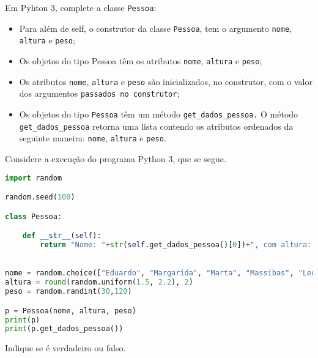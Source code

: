 \documentclass[12pt,varwidth=16cm,border=17pt]{standalone}
\begin{document}
Em Pyhton 3, complete a classe \verb+Pessoa+:

\begin{itemize}
  \item Para além de self, o construtor da classe \verb+Pessoa+, tem o argumento \verb+nome+, \verb+altura+ e \verb+peso+;
  \item Os objetos do tipo Pessoa têm os atributos \verb+nome+, \verb+altura+ e \verb+peso+;
  \item Os atributos \verb+nome+, \verb+altura+ e \verb+peso+ são inicializados, no construtor, com o valor
   dos argumentos \verb+passados no construtor+;
  \item Os objetos do tipo \verb+Pessoa+ têm um método \verb+get_dados_pessoa.+ 
  O método \verb+get_dados_pessoa+ retorna uma lista contendo os atributos ordenados da seguinte maneira: \verb+nome+, \verb+altura+ e \verb+peso+. 
\end{itemize}

Considere a execução do programa Python 3, que se segue. 

\begin{lstlisting}[language=Python]
import random

random.seed(100)

class Pessoa:

	def __str__(self):
		return "Nome: "+str(self.get_dados_pessoa()[0])+", com altura: "+str(self.get_dados_pessoa()[1])+" e peso: "+str(self.get_dados_pessoa()[2])
		

nome = random.choice(["Eduardo", "Margarida", "Marta", "Massibas", "Leonor", "Diogo", "Madorna", "Duarte", "Pedro", "Miguel", "Beatriz", "Rita", "Fonseca"])
altura = round(random.uniform(1.5, 2.2), 2)
peso = random.randint(30,120)

p = Pessoa(nome, altura, peso)
print(p)
print(p.get_dados_pessoa())
\end{lstlisting}

Indique se é verdadeiro ou falso.
\end{document}
